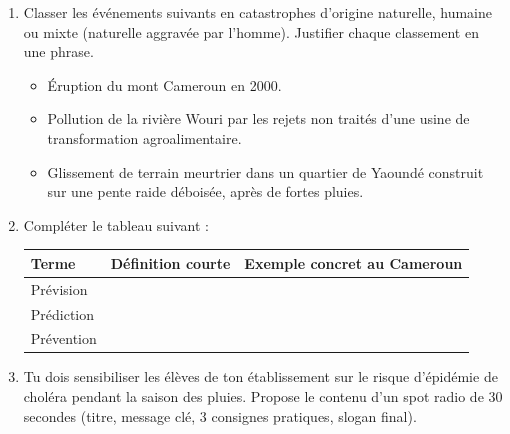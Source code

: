 \documentclass[11pt]{article}
\begin{document}
\begin{exercice}
\begin{enumerate}
\item Classer les événements suivants en catastrophes d'origine naturelle, humaine ou mixte (naturelle aggravée par l'homme). Justifier chaque classement en une phrase.
\begin{itemize}
\item[a)] Éruption du mont Cameroun en 2000.
\item[b)] Pollution de la rivière Wouri par les rejets non traités d'une usine de transformation agroalimentaire.
\item[c)] Glissement de terrain meurtrier dans un quartier de Yaoundé construit sur une pente raide déboisée, après de fortes pluies.
\end{itemize}
\item Compléter le tableau suivant :
\begin{center}
\begin{tabularx}{\linewidth}{|l|X|X|}\hline
\textbf{Terme} & \textbf{Définition courte} & \textbf{Exemple concret au Cameroun} \\ \hline
Prévision & & \\ \hline
Prédiction & & \\ \hline
Prévention & & \\ \hline
\end{tabularx}
\end{center}
\item Tu dois sensibiliser les élèves de ton établissement sur le risque d'épidémie de choléra pendant la saison des pluies. Propose le contenu d'un spot radio de 30 secondes (titre, message clé, 3 consignes pratiques, slogan final).
\end{enumerate}
\end{exercice}
\end{document}
